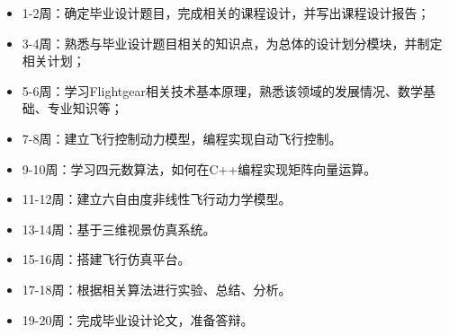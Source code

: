 \noindent
\begin{itemize}
\item 1-2周：确定毕业设计题目，完成相关的课程设计，并写出课程设计报告；
\item 3-4周：熟悉与毕业设计题目相关的知识点，为总体的设计划分模块，并制定相关计划；
\item 5-6周：学习Flightgear相关技术基本原理，熟悉该领域的发展情况、数学基础、专业知识等；
\item 7-8周：建立飞行控制动力模型，编程实现自动飞行控制。
\item 9-10周：学习四元数算法，如何在C++编程实现矩阵向量运算。
\item 11-12周：建立六自由度非线性飞行动力学模型。
\item 13-14周：基于三维视景仿真系统。
\item 15-16周：搭建飞行仿真平台。
\item 17-18周：根据相关算法进行实验、总结、分析。
\item 19-20周：完成毕业设计论文，准备答辩。
\end{itemize}


